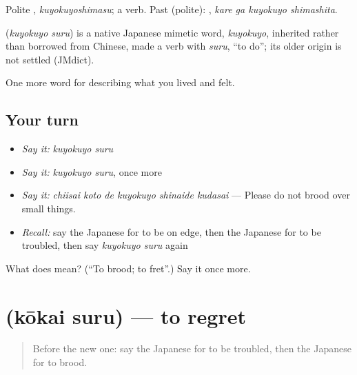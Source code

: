 Polite \textbf{}, \emph{kuyokuyoshimasu}; a  verb. Past (polite): \textbf{ }, \emph{kare ga kuyokuyo shimashita}.

\begin{cousinweb}
\textbf{} (\emph{kuyokuyo suru}) is a native Japanese mimetic word, \emph{kuyokuyo}, inherited rather than borrowed from Chinese, made a verb with \emph{suru}, \textquotedblleft{}to do\textquotedblright{}; its older origin is not settled (JMdict).
\end{cousinweb}

\begin{grammarlens}[title={What you've built}]
One more word for describing what you lived and felt.
\end{grammarlens}

\subsection*{Your turn}
\begin{itemize}
\raggedright
  \item \emph{Say it:} \emph{kuyokuyo suru}
  \item \emph{Say it:} \emph{kuyokuyo suru}, once more
  \item \emph{Say it:} \emph{chiisai koto de kuyokuyo shinaide kudasai} — Please do not brood over small things.
  \item \emph{Recall:} say the Japanese for to be on edge, then the Japanese for to be troubled, then say \emph{kuyokuyo suru} again
\end{itemize}

\begin{tcolorbox}[breakable,colback=teal!4,colframe=teal!35!black,title={Before you move on}]
What does  mean? (\textquotedblleft{}To brood; to fret\textquotedblright{}.) Say it once more.
\end{tcolorbox}
\section[\texorpdfstring{\ja{こうかいする} (kōkai suru)}{こうかいする (kōkai suru)}]{ (kōkai suru) — to regret}

\label{lesson:JA-C432-koukai-suru}



\begin{quote}
Before the new one: say the Japanese for to be troubled, then the Japanese for to brood.
\end{quote}

